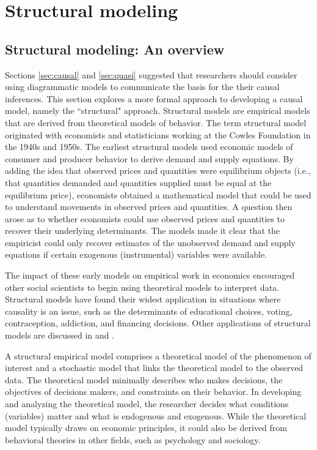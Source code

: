 \section{Structural modeling} \label{sec:struct}

\subsection{Structural modeling: An overview}

Sections \ref{sec:causal} and \ref{sec:quasi} suggested that  researchers should consider using diagrammatic models to communicate the basis for the their causal inferences.
This section explores a more formal approach to developing a causal model, namely the ``structural" approach. Structural models are empirical models that are derived from theoretical models of behavior.
The term structural model originated with economists and statisticians working at the Cowles Foundation in the 1940s and 1950s.
The earliest structural models used economic models of consumer and producer behavior to derive demand and supply equations.
By adding the idea that observed prices and quantities were equilibrium objects (i.e., that quantities demanded and quantities supplied must be equal at the equilibrium price), economists obtained a mathematical model that could be used to understand movements in observed prices and quantities. 
A question then arose as to whether economists could use observed prices and quantities to recover their underlying determinants.
The models made it clear that the empiricist could only recover estimates of the unobserved demand and supply equations if certain exogenous 
(instrumental) variables were available. 

The impact of these early models on empirical work in economics encouraged other social scientists to begin using theoretical models to interpret data. 
Structural models have found their widest application in situations where causality is an issue, such as the determinants of educational choices, voting, contraception, addiction, and financing decisions. 
Other applications of structural models are discussed in \citet{Reiss:2007ej} and \citet{Reiss:2011go}.

A structural empirical model comprises a theoretical model of the phenomenon of interest and a stochastic model that links the theoretical model to the observed data.
The theoretical model minimally describes who makes decisions, the objectives of decisions makers, and constraints on their behavior.
In developing and analyzing the theoretical model, the researcher decides what conditions (variables) matter and what is endogenous and exogenous.
While the theoretical model typically draws on economic principles, it could also be derived from behavioral theories in other fields, such as psychology and sociology.


